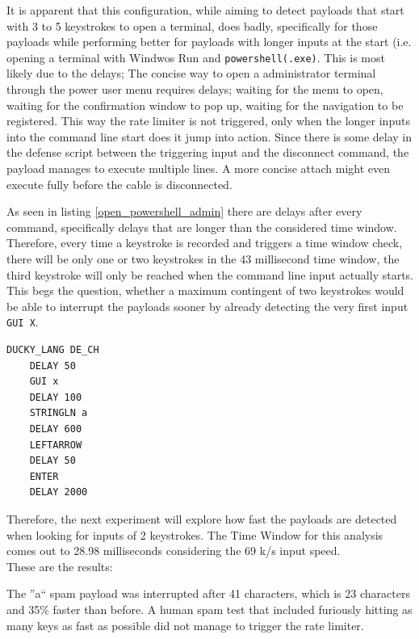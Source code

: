It is apparent that this configuration, while aiming to detect payloads that start with 3 to 5 keystrokes to open a terminal, does badly, specifically for those payloads while performing better for payloads with longer inputs at the start (i.e. opening a terminal with Windwos Run and \verb|powershell(.exe)|. This is most likely due to the delays; The concise way to open a administrator terminal through the power user menu requires delays; waiting for the menu to open, waiting for the confirmation window to pop up, waiting for the navigation to be registered. This way the rate limiter is not triggered, only when the longer inputs into the command line start does it jump into action. Since there is some delay in the defense script between the triggering input and the disconnect command, the payload manages to execute multiple lines.  A more concise attach might even execute fully before the cable is disconnected. 

As seen in listing \ref{open_powershell_admin} there are delays after every command, specifically delays that are longer than the considered time window. Therefore, every time a keystroke is recorded and triggers a time window check, there will be only one or two keystrokes in the 43 millisecond time window, the third keystroke will only be reached when the command line input actually starts. This begs the question, whether a maximum contingent of two keystrokes would be able to interrupt the payloads sooner by already detecting the very first input \verb|GUI X|. 

\begin{lstlisting}[caption={First 10 lines of ``Schedule Job'' Payload},label=lst:open_powershell_admin, captionpos=b]
    DUCKY_LANG DE_CH
    DELAY 50
    GUI x
    DELAY 100
    STRINGLN a
    DELAY 600
    LEFTARROW
    DELAY 50
    ENTER
    DELAY 2000
\end{lstlisting}

Therefore, the next experiment will explore how fast the payloads are detected when looking for inputs of 2 keystrokes. The Time Window for this analysis comes out to 28.98 milliseconds considering the 69 k/s input speed.\\
These are the results:

The ''a`` spam payload was interrupted after 41 characters, which is 23 characters and 35\% faster than before. A human spam test that included furiously hitting as many keys as fast as possible did not manage to trigger the rate limiter.

